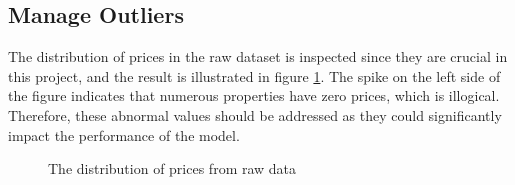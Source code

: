 \documentclass[12pt,twoside]{report}
\begin{document}
\subsection{Manage Outliers}
The distribution of prices in the raw dataset is inspected since they are crucial in this project, and the result is illustrated in figure \ref{price_raw}. The spike on the left side of the figure indicates that numerous properties have zero prices, which is illogical. Therefore, these abnormal values should be addressed as they could significantly impact the performance of the model.

\begin{figure}[!htbp]
	\centering
	\hfill
	\hfill
	\caption{The distribution of prices from raw data}
	\label{price_raw}
\end{figure}
\end{document}
